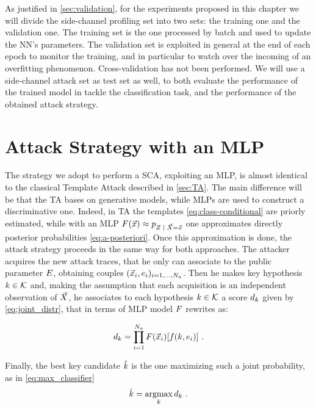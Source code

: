 As justified in \ref{sec:validation}, for the experiments proposed in this chapter we will divide the side-channel profiling set into two sets: the training one and the validation one. The training set is the one processed by batch and used to update the NN's parameters. The validation set is exploited in general at the end of each epoch to monitor the training, and in particular to watch over the incoming of an overfitting phenomenon. Cross-validation has not been performed. We will use a side-channel attack set as test set as well, to both evaluate the performance of the trained model in tackle the classification task, and the performance of the obtained attack strategy.

\section{Attack Strategy with an MLP}\label{sec:attackNN}
The strategy we adopt to perform a SCA, exploiting an MLP, is almost identical to the classical Template Attack described in \ref{sec:TA}. The main difference will be that the TA bases on generative models, while MLPs are used to construct a discriminative one. Indeed, in TA the templates \eqref{eq:class-conditional} are priorly estimated, while with an MLP $\MLmodel(\vLeakVec) \approx \pdf_{\given{\sensRandVar}{\vaLeakVec=\vLeakVec}}$ one approximates directly posterior probabilities \eqref{eq:a-posteriori}. Once this approximation is done, the attack strategy proceeds in the same way for both approaches. The attacker acquires the new attack traces, that he only can associate to the public parameter $E$, obtaining couples  $(\vec{x}_i, e_i)_{i=1, \dots , N_a}$. Then he makes key hypothesis $k \in \mathcal{K}$ and, making the assumption that each acquisition is an independent observation of $\vec{X}$, he associates to each hypothesis $k \in \mathcal{K}$ a score $d_k$ given by \eqref{eq:joint_distr}, that in terms of MLP model $F$ rewrites  as:

\begin{equation}\label{eq:NN_SCA}
d_{k} = \prod_{i=1}^{N_a} F(\vec{x}_i)[f(k,e_i)] \mbox{ .}
\end{equation}

Finally, the best key candidate $\hat{k}$ is the one maximizing such a joint probability, as in \eqref{eq:max_classifier}
\begin{equation}
\hat{k} = \operatorname*{argmax}_{k} d_{k} \mbox{ .}
\end{equation}


